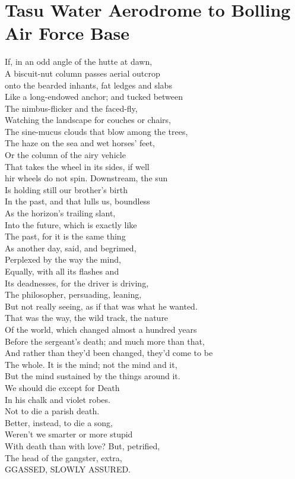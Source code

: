 \documentclass[smalldemyvopaper,11pt,twoside,onecolumn,openright,extrafontsizes]{memoir}
\begin{document}
\chapter{Tasu Water Aerodrome to Bolling Air Force Base}
If, in an odd angle of the hutte at dawn,
\\A biscuit-nut column passes aerial outcrop
\\onto the bearded inhants, fat ledges and slabs
\\Like a long-endowed anchor; and tucked between
\\The nimbus-flicker and the faced-fly,
\\Watching the landscape for couches or chairs,
\\The sine-mucus clouds that blow among the trees,
\\The haze on the sea and wet horses' feet,
\\Or the column of the airy vehicle
\\That takes the wheel in its sides, if well
\\hir wheels do not spin. Downstream, the sun
\\Is holding still our brother's birth
\\In the past, and that lulls us, boundless
\\As the horizon's trailing slant,
\\Into the future, which is exactly like
\\The past, for it is the same thing
\\As another day, said, and begrimed,
\\Perplexed by the way the mind,
\\Equally, with all its flashes and
\\Its deadnesses, for the driver is driving,
\\The philosopher, persuading, leaning,
\\But not really seeing, as if that was what he wanted.
\\That was the way, the wild track, the nature
\\Of the world, which changed almost a hundred years
\\Before the sergeant's death; and much more than that,
\\And rather than they'd been changed, they'd come to be
\\The whole. It is the mind; not the mind and it,
\\But the mind sustained by the things around it.
\\We should die except for Death
\\In his chalk and violet robes.
\\Not to die a parish death.
\\Better, instead, to die a song,
\\Weren't we smarter or more stupid
\\With death than with love? But, petrified,
\\The head of the gangster, extra,
\\GGASSED, SLOWLY ASSURED.
\end{document}
